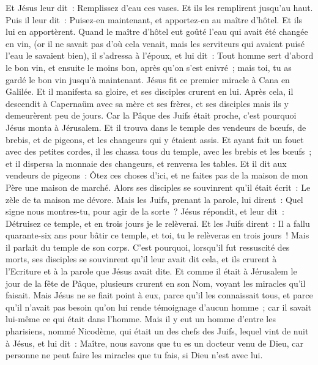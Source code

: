 \begin{multicols}{2}
Et Jésus leur dit~: Remplissez d'eau ces vases. Et ils les remplirent jusqu'au haut.
Puis il leur dit~: Puisez-en maintenant, et apportez-en au maître d'hôtel. Et ils lui en apportèrent.
Quand le maître d'hôtel eut goûté l'eau qui avait été changée en vin, (or il ne savait pas d'où cela venait, mais les serviteurs qui avaient puisé l'eau le savaient bien), il s'adressa à l'époux,
et lui dit~: Tout homme sert d'abord le bon vin, et ensuite le moins bon, après qu'on s'est enivré~; mais toi, tu as gardé le bon vin jusqu'à maintenant.
Jésus fit ce premier miracle à Cana en Galilée. Et il manifesta sa gloire, et ses disciples crurent en lui.
Après cela, il descendit à Capernaüm avec sa mère et ses frères, et ses disciples mais ils y demeurèrent peu de jours.
Car la Pâque des Juifs était proche, c'est pourquoi Jésus monta à Jérusalem.
Et il trouva dans le temple des vendeurs de bœufs, de brebis, et de pigeons, et les changeurs qui y étaient assis.
Et ayant fait un fouet avec des petites cordes, il les chassa tous du temple, avec les brebis et les bœufs~; et il dispersa la monnaie des changeurs, et renversa les tables.
Et il dit aux vendeurs de pigeons~: Ôtez ces choses d'ici, et ne faites pas de la maison de mon Père une maison de marché.
Alors ses disciples se souvinrent qu'il était écrit~: Le zèle de ta maison me dévore.
Mais les Juifs, prenant la parole, lui dirent~: Quel signe nous montres-tu, pour agir de la sorte~?
Jésus répondit, et leur dit~: Détruisez ce temple, et en trois jours je le relèverai.
Et les Juifs dirent~: Il a fallu quarante-six ans pour bâtir ce temple, et toi, tu le relèveras en trois jours~!
Mais il parlait du temple de son corps.
C'est pourquoi, lorsqu'il fut ressuscité des morts, ses disciples se souvinrent qu'il leur avait dit cela, et ils crurent à l'Ecriture et à la parole que Jésus avait dite.
Et comme il était à Jérusalem le jour de la fête de Pâque, plusieurs crurent en son Nom, voyant les miracles qu'il faisait.
Mais Jésus ne se fiait point à eux, parce qu'il les connaissait tous,
et parce qu'il n'avait pas besoin qu'on lui rende témoignage d'aucun homme~; car il savait lui-même ce qui était dans l'homme.
\VerseOne{}Mais il y eut un homme d'entre les pharisiens, nommé Nicodème, qui était un des chefs des Juifs,
lequel vint de nuit à Jésus, et lui dit~: Maître, nous savons que tu es un docteur venu de Dieu, car personne ne peut faire les miracles que tu fais, si Dieu n'est avec lui.

\end{multicols}
